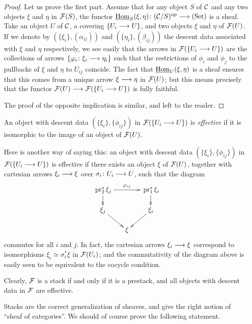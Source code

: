 \begin{4   STACKS}
\begin{4.1 Descent of objects of fibcats}
\begin{proof}
Let us prove the first part. Assume that  for any object $S$ of $\mathcal{C}$ and any two objects $\xi$ and $\eta$ in $\mathcal{F}(S)$, the functor $\underhom_S(\xi, \eta) \colon (\cC/S)\op \arr \catset$ is a sheaf. Take an object $U$ of $\mathcal{C}$, a covering $\{U_i\arr U\}$, and two objects $\xi$ and $\eta$ of $\mathcal{F}(U)$. If we denote by $(\{\xi_i\}, (\alpha_{ij}))$ and $(\{\eta_i\}, (\beta_{ij}))$ the descent data associated with $\xi$ and $\eta$ respectively, we see easily that the arrows in $\mathcal{F}(\{U_i \longrightarrow U\})$ are the collections of arrows $\{\phi_i \colon \xi_i \arr \eta_i\}$ such that the restrictions of $\phi_i$ and $\phi_j$ to the pullbacks of $\xi$ and $\eta$ to $U_{ij}$ coincide. The fact that $\mathop{\underline{\mathrm{Hom}}}\nolimits_U(\xi, \eta )$ is a sheaf ensures that this comes from a unique arrow $\xi \arr \eta$ in $\mathcal{F}(U)$; but this means precisely that the functor $\cF(U) \arr \cF(\{U_i \to U\})$ is fully faithful.

The proof of the opposite implication is similar, and left to the reader.
\end{proof}

\begin{definition}
An object with descent data $(\{\xi_i\}, \{\phi_{ij}\})$ in $\mathcal{F}(\{U_i \longrightarrow U\})$ is \emph{effective} if it is isomorphic to the image of an object of $\mathcal{F}(U)$.
\end{definition}

Here is another way of saying this: an object with descent data $(\{\xi_i\}, \{\phi_{ij}\})$ in $\mathcal{F}(\{U_i \longrightarrow U\})$ is effective if there exists an object $\xi$ of $\mathcal{F}(U)$, together with cartesian arrows $\xi_i \arr \xi$ over $\sigma_i \colon U_i \arr U$, such that the diagram
   \[
   \xymatrix@C-10pt@R-10pt{
   {}\pr_2^* \xi_j \ar[rr]^{\phi_{ij}} \ar[d] &&
   {}\pr_1^* \xi_i \ar[d] \\
   \xi_j \ar[rd] &&
   \xi_i \ar[ld]\\
   &\xi
   }
   \]
commutes for all $i$ and $j$. In fact, the cartesian arrows $\xi_i \arr \xi$ correspond to isomorphisms $\xi_i \simeq \sigma_i^* \xi$ in $\mathcal{F}(U_i)$; and the commutativity of the diagram above  is easily seen to be equivalent to the cocycle condition.

Clearly, $\mathcal{F}$ is a stack if and only if it is a prestack, and all objects with descent data in $\mathcal{F}$ are effective.



Stacks are the correct generalization of sheaves, and give the right notion of ``sheaf of categories''. We should of course prove the following statement.


\end{4.1 Descent of objects of fibcats}
\end{4   STACKS}
